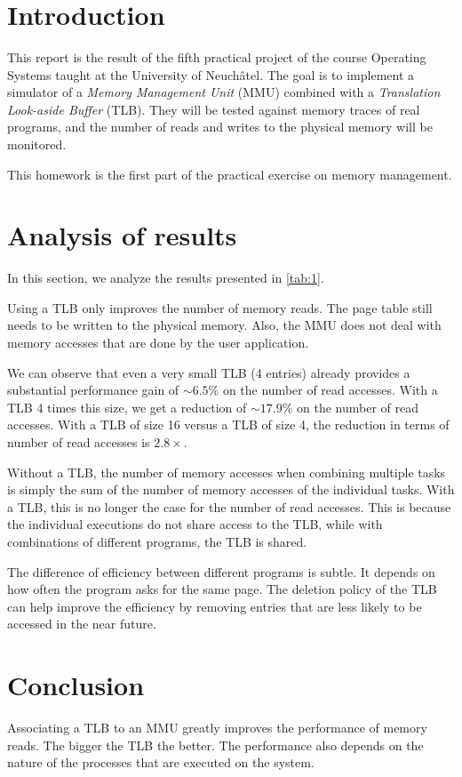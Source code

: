 \documentclass[11pt,a4paper]{scrartcl}
\author{\myauthor}
\title{\huge \textbf{\mytitle}}
\begin{document}
\begin{otherlanguage}{australian}
\maketitle
\end{otherlanguage}

\section*{Introduction}

This report is the result of the fifth practical project of the course Operating Systems taught at the University of Neuchâtel. The goal is to implement a simulator of a \textit{Memory Management Unit} (MMU) combined with a \textit{Translation Look-aside Buffer} (TLB). They will be tested against memory traces of real programs, and the number of reads and writes to the physical memory will be monitored.

This homework is the first part of the practical exercise on memory management.

\section*{Analysis of results}



In this section, we analyze the results presented in \autoref{tab:1}.

Using a TLB only improves the number of memory reads. The page table still needs to be written to the physical memory. Also, the MMU does not deal with memory accesses that are done by the user application.

We can observe that even a very small TLB (4 entries) already provides a substantial performance gain of $\sim 6.5 \%$ on the number of read accesses. With a TLB 4 times this size, we get a reduction of $\sim 17.9 \%$ on the number of read accesses. With a TLB of size 16 versus a TLB of size 4, the reduction in terms of number of read accesses is $2.8 \times$.

Without a TLB, the number of memory accesses when combining multiple tasks is simply the sum of the number of memory accesses of the individual tasks. With a TLB, this is no longer the case for the number of read accesses. This is because the individual executions do not share access to the TLB, while with combinations of different programs, the TLB is shared.

The difference of efficiency between different programs is subtle. It depends on how often the program asks for the same page. The deletion policy of the TLB can help improve the efficiency by removing entries that are less likely to be accessed in the near future.

\section*{Conclusion}

Associating a TLB to an MMU greatly improves the performance of memory reads. The bigger the TLB the better. The performance also depends on the nature of the processes that are executed on the system.
\end{document}
